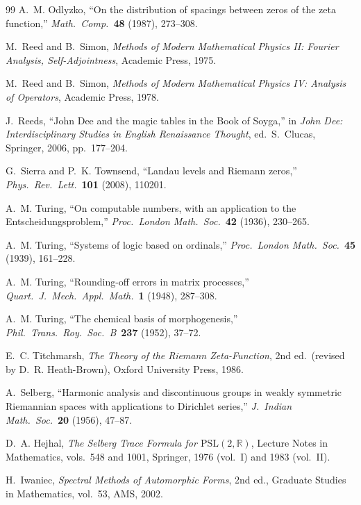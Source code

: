 \documentclass[11pt,a4paper]{article}
\theoremstyle{plain}
\theoremstyle{remark}
\newcommand{\R}{\mathbb{R}}
\begin{document}
\begin{thebibliography}{99}
A.~M. Odlyzko,
``On the distribution of spacings between zeros of the zeta function,''
\emph{Math.\ Comp.}\ \textbf{48} (1987), 273--308.

M.~Reed and B.~Simon,
\emph{Methods of Modern Mathematical Physics II: Fourier Analysis,
Self-Adjointness}, Academic Press, 1975.

M.~Reed and B.~Simon,
\emph{Methods of Modern Mathematical Physics IV: Analysis of Operators},
Academic Press, 1978.

J.~Reeds,
``John Dee and the magic tables in the Book of Soyga,''
in \emph{John Dee: Interdisciplinary Studies in English Renaissance
Thought}, ed.\ S.~Clucas, Springer, 2006, pp.~177--204.

G.~Sierra and P.~K. Townsend,
``Landau levels and Riemann zeros,''
\emph{Phys.\ Rev.\ Lett.}\ \textbf{101} (2008), 110201.

A.~M. Turing,
``On computable numbers, with an application to the
Entscheidungsproblem,''
\emph{Proc.\ London Math.\ Soc.}\ \textbf{42} (1936), 230--265.

A.~M. Turing,
``Systems of logic based on ordinals,''
\emph{Proc.\ London Math.\ Soc.}\ \textbf{45} (1939), 161--228.

A.~M. Turing,
``Rounding-off errors in matrix processes,''
\emph{Quart.\ J.\ Mech.\ Appl.\ Math.}\ \textbf{1} (1948), 287--308.

A.~M. Turing,
``The chemical basis of morphogenesis,''
\emph{Phil.\ Trans.\ Roy.\ Soc.\ B}\ \textbf{237} (1952), 37--72.

E.~C. Titchmarsh,
\emph{The Theory of the Riemann Zeta-Function},
2nd ed.\ (revised by D.~R. Heath-Brown),
Oxford University Press, 1986.

A.~Selberg,
``Harmonic analysis and discontinuous groups in weakly symmetric
Riemannian spaces with applications to Dirichlet series,''
\emph{J.\ Indian Math.\ Soc.}\ \textbf{20} (1956), 47--87.

D.~A. Hejhal,
\emph{The Selberg Trace Formula for $\mathrm{PSL}(2,\R)$},
Lecture Notes in Mathematics, vols.~548 and 1001, Springer,
1976 (vol.~I) and 1983 (vol.~II).

H.~Iwaniec,
\emph{Spectral Methods of Automorphic Forms}, 2nd ed.,
Graduate Studies in Mathematics, vol.~53, AMS, 2002.


\end{thebibliography}
\end{document}
